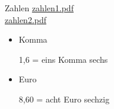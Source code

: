 \begin{semantics}{Zahlen}{}
\href{./files/zahlen1.pdf}{zahlen1.pdf} \\
\href{./files/zahlen2.pdf}{zahlen2.pdf}
\begin{itemize}
	\item Komma
		\begin{mdframed}
			1,6 = eins Komma sechs
		\end{mdframed}
	\item Euro
		\begin{mdframed}
			8,60 = acht Euro sechzig
		\end{mdframed}
\end{itemize}
\end{semantics}
